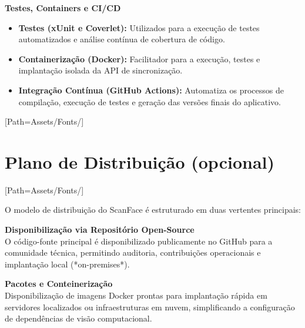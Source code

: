 \documentclass{article}
\begin{document}
\vspace{0.3cm}

\textbf{Testes, Containers e CI/CD}
\begin{itemize}[leftmargin=*]
    \item \textbf{Testes (xUnit e Coverlet):} Utilizados para a execução de testes automatizados e análise contínua de cobertura de código.
    \item \textbf{Containerização (Docker):} Facilitador para a execução, testes e implantação isolada da API de sincronização.
    \item \textbf{Integração Contínua (GitHub Actions):} Automatiza os processos de compilação, execução de testes e geração das versões finais do aplicativo.
\end{itemize}
\newpage

\setmainfont{LEMONMILK-Bold.otf}[Path=Assets/Fonts/]
\section{Plano de Distribuição (opcional)}
\setmainfont{LEMONMILK-Regular.otf}[Path=Assets/Fonts/]

O modelo de distribuição do ScanFace é estruturado em duas vertentes principais:

\vspace{0.4cm}

\textbf{Disponibilização via Repositório Open-Source} \\
O código-fonte principal é disponibilizado publicamente no GitHub para a comunidade técnica, permitindo auditoria, contribuições operacionais e implantação local (*on-premises*).

\vspace{0.3cm}

\textbf{Pacotes e Conteinerização} \\
Disponibilização de imagens Docker prontas para implantação rápida em servidores localizados ou infraestruturas em nuvem, simplificando a configuração de dependências de visão computacional.
\newpage

\end{document}
